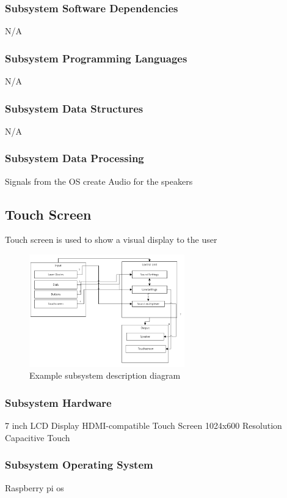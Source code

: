 \subsubsection{Subsystem Software Dependencies}
N/A

\subsubsection{Subsystem Programming Languages}
N/A

\subsubsection{Subsystem Data Structures}
N/A

\subsubsection{Subsystem Data Processing}
Signals from the OS create Audio for the speakers 


\subsection{Touch Screen}
Touch screen is used to show a visual display to the user

\begin{figure}[h!]
	\centering
 	\includegraphics[width=0.60\textwidth]{images/subsystem}
 \caption{Example subsystem description diagram}
\end{figure}

\subsubsection{Subsystem Hardware}
7 inch LCD Display HDMI-compatible Touch Screen 1024x600 Resolution Capacitive Touch

\subsubsection{Subsystem Operating System}
Raspberry pi os

